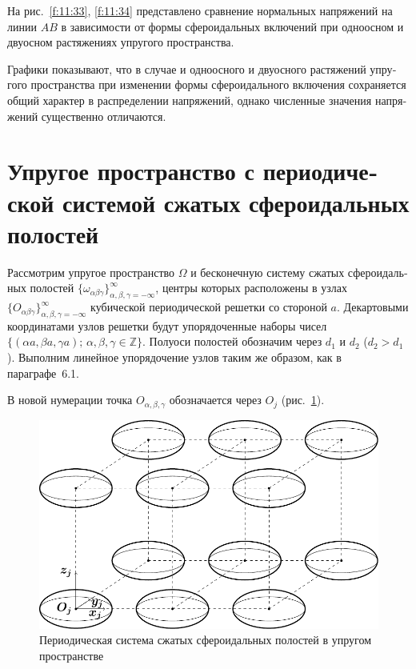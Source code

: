 \begin{russian}
На рис.~\ref{f:11:33}, \ref{f:11:34} представлено сравнение нормальных напряжений на линии $AB$ в зависимости от формы сфероидальных включений при одноосном и двуосном растяжениях упругого пространства.

Графики показывают, что в случае и одноосного и двуосного растяжений упругого пространства при изменении формы сфероидального включения сохраняется общий характер в распределении напряжений, однако численные значения напряжений существенно отличаются.


\section[Упругое пространство с периодической системой сжатых сфероидальных полостей]{Упругое пространство с периодической системой сжатых сфероидальных полостей}

Рассмотрим упругое пространство $\Omega$ и бесконечную систему сжатых сфероидальных полостей $\{\omega_{\alpha\beta\gamma}\}_{\alpha,\beta,\gamma=-\infty}^\infty$, центры которых расположены в узлах $\{O_{\alpha\beta\gamma}\}_{\alpha,\beta,\gamma=-\infty}^\infty$ кубической периодической решетки со стороной $a$. Декартовыми координатами узлов решетки будут упорядоченные наборы чисел $\{(\alpha a,\beta a,\gamma a);\,\alpha,\beta,\gamma\in\mathbb{Z}\}$. Полуоси полостей обозначим через $d_1$ и $d_2$ ($d_2>d_1$). Выполним линейное упорядочение узлов таким же образом, как в параграфе~6.1.\sloppy

В новой нумерации точка $O_{\alpha,\beta,\gamma}$ обозначается через $O_j$ (рис.~\ref{f:11:1b}).

\begin{figure}[h!]
\centering
\includegraphics[width=12cm]{oblate-spheroids-periodic.pdf}
\caption{Периодическая система сжатых сфероидальных полостей в упругом пространстве}
\label{f:11:1b}
\end{figure}


\end{russian}
